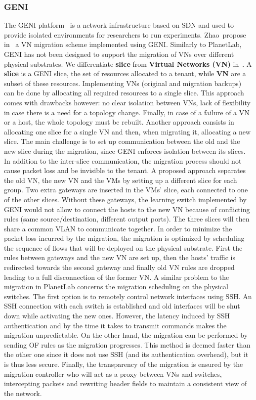 \subsubsection{GENI}
The GENI platform~\cite{GENI-Berman2014} is a network infrastructure based on SDN and used to provide isolated environments for researchers to run experiments.
Zhao~\etal propose in~\cite{Zhao2017} a VN migration scheme implemented using GENI. 
Similarly to PlanetLab, GENI has not been designed to support the migration of VNs over different physical substrates. 
We differentiate \textbf{slice} from \textbf{Virtual Networks (VN)} in~\cite{Zhao2017}.
A \textbf{slice} is a GENI slice, \ie the set of resources allocated to a tenant, while \textbf{VN}  are a subset of these resources.
Implementing VNs (original and migration backups) can be done by allocating all required resources to a single slice. This approach comes with drawbacks however: no clear isolation between VNs, lack of flexibility in case there is a need for a topology change. Finally, in case of a failure of a VN or a host, the whole topology must be rebuilt.
Another approach consists in allocating one slice for a single VN and then, when migrating it, allocating a new slice. The main challenge is to set up communication between the old and the new slice during the migration, since GENI enforces isolation between its slices.
In addition to the inter-slice communication, the migration process should not cause packet loss and be invisible to the tenant.
A proposed approach separates the old VN, the new VN and the VMs by setting up a different slice for each group. Two extra gateways are inserted in the VMs' slice, each connected to one of the other slices.
Without these gateways, the learning switch implemented by GENI would not allow to connect the hosts to the new VN because of conflicting rules (same source/destination, different output ports).
The three slices will then share a common VLAN to communicate together.
In order to minimize the packet loss incurred by the migration, the migration is optimized by scheduling the sequence of flows that will be deployed on the physical substrate.
First the rules between gateways and the new VN are set up, then the hosts' traffic is redirected towards the second gateway and finally old VN rules are dropped leading to a full disconnection of the former VN.
A similar problem to the migration in PlanetLab concerns the migration scheduling on the physical switches.
The first option is to remotely control network interfaces using SSH.
An SSH connection with each switch is established and old interfaces will be shut down while activating the new ones.
However, the latency induced by SSH authentication and by the time it takes to transmit commands makes the migration unpredictable.
On the other hand, the migration can be performed by sending OF rules as the migration progresses. This method is deemed faster than the other one since it does not use SSH (and its authentication overhead), but it is thus less secure.
Finally, the transparency of the migration is ensured by the migration controller who will act as a proxy between VNs and switches, intercepting packets and rewriting header fields to maintain a consistent view of the network.

